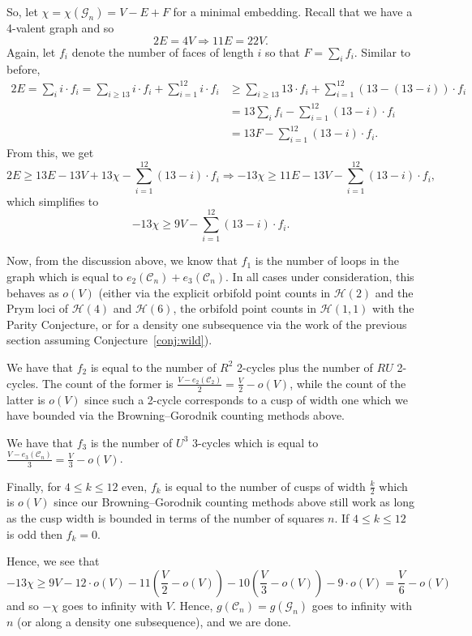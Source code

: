 \documentclass[a4paper,11pt]{amsart}
\numberwithin{equation}{section}
\numberwithin{figure}{section}
\numberwithin{table}{section}
\newcommand{\calH}{\mathcal{H}}
\begin{document}
So, let $\chi = \chi(\mathcal{G}_{n}) = V -E+F$ for a minimal embedding. Recall that we have a 4-valent graph and so
\[2E = 4V \Rightarrow 11E = 22V.\]
Again, let $f_{i}$ denote the number of faces of length $i$ so that $F = \sum_i f_i$. Similar to before,
\begin{equation*}
    \begin{split}
    2E = \sum_{i} i\cdot f_{i} = \sum_{i\geq 13}i\cdot f_{i} + \sum_{i=1}^{12} i \cdot f_{i} &\geq \sum_{i\geq 13}13\cdot f_{i} + \sum_{i=1}^{12} (13-(13-i)) \cdot f_{i} \\
    &= 13\sum_{i}f_{i} - \sum_{i = 1}^{12}(13-i)\cdot f_{i} \\
    &= 13F - \sum_{i = 1}^{12}(13-i)\cdot f_{i}. 
    \end{split}
\end{equation*}
From this, we get 
\[
    2E\geq 13E - 13V + 13\chi - \sum_{i = 1}^{12}(13-i)\cdot f_{i} \Rightarrow -13\chi \geq 11E - 13V - \sum_{i = 1}^{12}(13-i)\cdot f_{i},
\]
which simplifies to
\[-13\chi \geq 9V - \sum_{i = 1}^{12}(13-i)\cdot f_{i}.\]

Now, from the discussion above, we know that $f_1$ is the number of loops in the graph which is equal to $e_{2}(\mathcal{C}_{n})+e_{3}(\mathcal{C}_{n})$. In all cases under consideration, this behaves as $o(V)$ (either via the explicit orbifold point counts in $\calH(2)$ and the Prym loci of $\calH(4)$ and $\calH(6)$, the orbifold point counts in $\calH(1,1)$ with the Parity Conjecture, or for a density one subsequence via the work of the previous section assuming Conjecture~\ref{conj:wild}).

We have that $f_{2}$ is equal to the number of $R^{2}$ 2-cycles plus the number of $RU$ 2-cycles. The count of the former is $\frac{V-e_{2}(\mathcal{C}_{2})}{2} = \frac{V}{2}-o(V)$, while the count of the latter is $o(V)$ since such a 2-cycle corresponds to a cusp of width one which we have bounded via the Browning--Gorodnik counting methods above.

We have that $f_{3}$ is the number of $U^{3}$ 3-cycles which is equal to $\frac{V-e_{3}(\mathcal{C}_{n})}{3} = \frac{V}{3}-o(V)$.

Finally, for $4\leq k\leq 12$ even, $f_k$ is equal to the number of cusps of width $\frac{k}{2}$ which is $o(V)$ since our Browning--Gorodnik counting methods above still work as long as the cusp width is bounded in terms of the number of squares $n$. If $4\leq k\leq 12$ is odd then $f_k = 0$.

Hence, we see that 
\[-13\chi \geq 9V - 12\cdot o(V) - 11\left(\frac{V}{2}-o(V)\right) - 10\left(\frac{V}{3}-o(V)\right) - 9\cdot o(V) = \frac{V}{6}-o(V)\]
and so $-\chi$ goes to infinity with $V$. Hence, $g(\mathcal{C}_{n}) = g(\mathcal{G}_{n})$ goes to infinity with $n$ (or along a density one subsequence), and we are done. 
\end{document}
